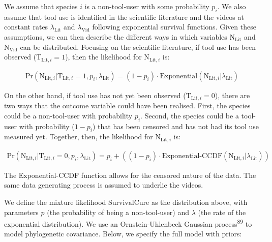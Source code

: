 \documentclass[
  man, donotrepeattitle,floatsintext]{apa6}
\begin{document}
We assume that species \(i\) is a non-tool-user with some
probability \(p_i\). We also assume that tool use is identified in the scientific
literature and the videos at constant rates \(\lambda_{\text{Lit}}\)
and \(\lambda_{\text{Vid}}\) following exponential survival functions. Given these
assumptions, we can then describe the different ways in which variables
\(\text{N}_\text{Lit}\) and \(\text{N}_\text{Vid}\) can be distributed. Focusing on
the scientific literature, if tool use has been observed
(\(\text{T}_{\text{Lit},i} = 1\)), then the likelihood for
\(\text{N}_{\text{Lit},i}\) is:

\begin{align}
\text{Pr}(\text{N}_{\text{Lit},i}|\text{T}_{\text{Lit},i} = 1,p_i,\lambda_\text{Lit}) = (1-p_i)\cdot\text{Exponential}(\text{N}_{\text{Lit},i}|\lambda_\text{Lit})
\end{align}

On the other hand, if tool use has not yet been observed
(\(\text{T}_{\text{Lit},i} = 0\)), there are two ways that the outcome variable
could have been realised. First, the species could be a non-tool-user with
probability \(p_i\). Second, the species could be a tool-user with probability
(\(1 - p_i\)) that has been censored and has not had its tool use measured yet.
Together, then, the likelihood for \(\text{N}_{\text{Lit},i}\) is:

\begin{align}
\text{Pr}(\text{N}_{\text{Lit},i}|\text{T}_{\text{Lit},i} = 0,p_i,\lambda_\text{Lit}) = p_i + ((1-p_i)\cdot\text{Exponential-CCDF}(\text{N}_{\text{Lit},i}|\lambda_\text{Lit}))
\end{align}

The Exponential-CCDF function allows for the censored nature of the data. The
same data generating process is assumed to underlie the videos.

We define the mixture likelihood \(\text{SurvivalCure}\) as the distribution
above, with parameters \(p\) (the probability of being a non-tool-user)
and \(\lambda\) (the rate of the exponential distribution). We use an
Ornstein-Uhlenbeck Gaussian process\textsuperscript{89} to model phylogenetic
covariance. Below, we specify the full model with priors:
\end{document}
